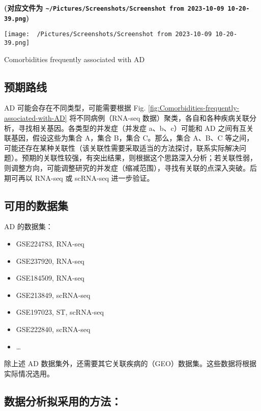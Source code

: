\documentclass[
]{article}
\providecommand{\tightlist}{%
  \setlength{\itemsep}{0pt}\setlength{\parskip}{0pt}}
\begin{document}
\textbf{(对应文件为 \texttt{\textasciitilde{}/Pictures/Screenshots/Screenshot\ from\ 2023-10-09\ 10-20-39.png})}

\def\@captype{figure}
\begin{center}
\texttt{[image: ~/Pictures/Screenshots/Screenshot from 2023-10-09 10-20-39.png]}
\caption{Comorbidities frequently associated with AD}\label{fig:Comorbidities-frequently-associated-with-AD}
\end{center}

\hypertarget{ux9884ux671fux8defux7ebf}{%
\subsection{预期路线}\label{ux9884ux671fux8defux7ebf}}

AD 可能会存在不同类型，可能需要根据 Fig. \ref{fig:Comorbidities-frequently-associated-with-AD} 将不同病例（RNA-seq 数据）聚类，各自和各种疾病关联分析，寻找相关基因。各类型的并发症（并发症 a、b、c）可能和 AD 之间有互关联基因，假设这些为集合 A，集合 B，集合 C。那么，集合 A、B、C 等之间，可能还存在某种关联性（该关联性需要采取适当的方法探讨，联系实际解决问题）。预期的关联性较强，有突出结果，则根据这个思路深入分析；若关联性弱，则调整方向，可能调整研究的并发症（缩减范围），寻找有关联的点深入突破。后期可再以 RNA-seq 或 scRNA-seq 进一步验证。

\hypertarget{ux53efux7528ux7684ux6570ux636eux96c6}{%
\subsection{可用的数据集}\label{ux53efux7528ux7684ux6570ux636eux96c6}}

AD 的数据集：

\begin{itemize}
\tightlist
\item
  GSE224783, RNA-seq
\item
  GSE237920, RNA-seq
\item
  GSE184509, RNA-seq
\item
  GSE213849, scRNA-seq
\item
  GSE197023, ST, scRNA-seq
\item
  GSE222840, scRNA-seq
\item
  \ldots{}
\end{itemize}

除上述 AD 数据集外，还需要其它关联疾病的（GEO）数据集。这些数据将根据实际情况选用。

\hypertarget{ux6570ux636eux5206ux6790ux62dfux91c7ux7528ux7684ux65b9ux6cd5}{%
\subsection{数据分析拟采用的方法：}\label{ux6570ux636eux5206ux6790ux62dfux91c7ux7528ux7684ux65b9ux6cd5}}
\end{document}
